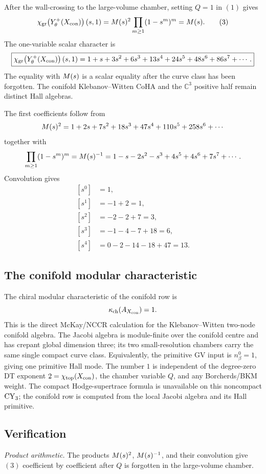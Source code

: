 After the wall-crossing to the large-volume chamber, setting \(Q=1\) in
\((1)\) gives
\[
  \chi_{\mathrm{gr}}\!\left(Y^{+}_{\theta}(X_{\mathrm{con}})\right)(s,1)
  =
  M(s)^2\prod_{m\geq 1}(1-s^m)^m
  =
  M(s).
  \tag{3}
\]
The one-variable scalar character is
\[
  \boxed{
  \chi_{\mathrm{gr}}\!\left(Y^{+}_{\theta}(X_{\mathrm{con}})\right)(s,1)
  =
  1+s+3s^2+6s^3+13s^4+24s^5+48s^6+86s^7+\cdots .}
\]
The equality with \(M(s)\) is a scalar equality after the curve
class has been forgotten.  The conifold Klebanov--Witten CoHA and the
\(\mathbb C^3\) positive half remain distinct Hall algebras.

The first coefficients follow from
\[
  M(s)^2
  =
  1+2s+7s^2+18s^3+47s^4+110s^5+258s^6+\cdots
\]
together with
\[
  \prod_{m\geq 1}(1-s^m)^m
  =
  M(s)^{-1}
  =
  1-s-2s^2-s^3+4s^5+4s^6+7s^7+\cdots .
\]
Convolution gives
\[
\begin{aligned}
  [s^0]&=1,\\
  [s^1]&=-1+2=1,\\
  [s^2]&=-2-2+7=3,\\
  [s^3]&=-1-4-7+18=6,\\
  [s^4]&=0-2-14-18+47=13.
\end{aligned}
\]

\subsection*{The conifold modular characteristic}

The chiral modular characteristic of the conifold row is
\[
  \kappa_{\mathrm{ch}}(A_{X_{\mathrm{con}}})=1.
\]
This is the direct McKay/NCCR calculation for the Klebanov--Witten
two-node conifold algebra.  The Jacobi algebra is module-finite over
the conifold centre and has crepant global dimension three; its two
small-resolution chambers carry the same single compact curve class.
Equivalently, the primitive GV input is \(n^0_{\beta}=1\), giving one
primitive Hall mode.  The number \(1\) is independent of the degree-zero
DT exponent \(2=\chi_{\mathrm{top}}(X_{\mathrm{con}})\), the chamber variable \(Q\),
and any Borcherds/BKM weight.  The compact Hodge-supertrace formula is
unavailable on this noncompact \(\mathrm{CY}_3\); the conifold row is computed
from the local Jacobi algebra and its Hall primitive.

\subsection*{Verification}

\emph{Product arithmetic.}  The products
\(M(s)^2\), \(M(s)^{-1}\), and their convolution give
\((3)\) coefficient by coefficient after \(Q\) is forgotten in the
large-volume chamber.

